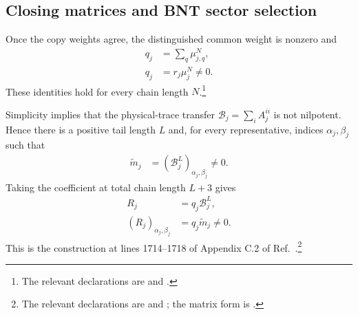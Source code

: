 \documentclass{article}
\begin{document}
\subsection{Closing matrices and BNT sector selection}

Once the copy weights agree, the distinguished common weight is nonzero and
\begin{align}
    q_j
        &=
        \sum_q\mu_{j,q}^{N},
    \label{eq:cpgsv17_mpdo_sal_zcl_eta_local_structure_sector_weight_sum}\\
    q_j
        &=
        r_j\mu_j^N
        \neq 0.
    \label{eq:cpgsv17_mpdo_sal_zcl_eta_local_structure_sector_weight_nonzero}
\end{align}
These identities hold for every chain length $N$.\footnote{The relevant
declarations are
 and
.}

Simplicity implies that the physical-trace transfer
$\mathcal B_j=\sum_i A_j^{ii}$ is not nilpotent. Hence there is a positive tail
length $L$ and, for every representative, indices $\alpha_j,\beta_j$ such that
\begin{align}
    \widetilde m_j
        &=
        (\mathcal B_j^L)_{\alpha_j,\beta_j}
        \neq 0.
    \label{eq:cpgsv17_mpdo_sal_zcl_eta_local_structure_nonzero_trace_tail}
\end{align}
Taking the coefficient at total chain length $L+3$ gives
\begin{align}
    R_j
        &=
        q_j\mathcal B_j^L,
    \label{eq:cpgsv17_mpdo_sal_zcl_eta_local_structure_closing_matrix}\\
    (R_j)_{\alpha_j,\beta_j}
        &=
        q_j\widetilde m_j
        \neq 0.
    \label{eq:cpgsv17_mpdo_sal_zcl_eta_local_structure_closing_matrix_entry}
\end{align}
This is the construction at lines 1714--1718 of Appendix C.2 of
Ref.~\cite{Cirac2016MPDO_arXiv}.\footnote{The relevant declarations are
and
;
the matrix form is
.}
\end{document}
